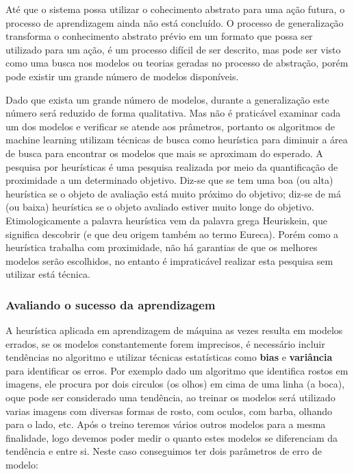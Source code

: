 Até que o sistema possa utilizar o cohecimento abstrato para uma ação futura, o processo de aprendizagem ainda não está concluído.
O processo de generalização transforma o conhecimento abstrato prévio em um formato que possa ser utilizado para um ação, é um 
processo difícil de ser descrito, mas pode ser visto como uma busca nos modelos ou teorias geradas no processo de abstração, porém pode existir
um grande número de modelos disponíveis.

Dado que exista um grande número de modelos, durante a generalização este número será reduzido de forma qualitativa. 
Mas não é praticável examinar cada um dos modelos e verificar se atende aos prâmetros, portanto os algoritmos de machine learning utilizam 
técnicas de busca como heurística para diminuir a área de busca para encontrar os modelos que mais se aproximam do esperado. \cite{heuristica}A pesquisa por heurísticas é uma pesquisa 
realizada por meio da quantificação de proximidade a um determinado objetivo. Diz-se que se tem uma boa (ou alta) heurística se o objeto de avaliação está muito 
próximo do objetivo; diz-se de má (ou baixa) heurística se o objeto avaliado estiver muito longe do objetivo. 
Etimologicamente a palavra heurística vem da palavra grega Heuriskein, que significa descobrir (e que deu origem também ao termo Eureca). 
Porém como a heurística trabalha com proximidade, não há garantias de que os melhores modelos serão escolhidos, 
no entanto é impraticável realizar esta pesquisa sem utilizar está técnica.

\subsubsection{Avaliando o sucesso da aprendizagem}
\label{subsec:avaliando-generalização-dados}

A heurística aplicada em aprendizagem de máquina as vezes resulta em modelos errados, se os modelos constantemente 
forem imprecisos, é necessário incluir tendências no algoritmo e utilizar técnicas estatísticas como \textbf{bias} e \textbf{variância} para identificar os erros.
Por exemplo dado um algoritmo que identifica rostos em imagens, ele procura por dois circulos (os olhos) em cima de uma linha (a boca), oque pode 
ser considerado uma tendência, ao treinar os modelos será utilizado varias imagens com diversas formas de rosto, com oculos, com barba, olhando para o lado, etc.
Após o treino teremos vários outros modelos para a mesma finalidade, logo devemos poder medir o quanto estes modelos 
se diferenciam da tendência e entre si. Neste caso conseguimos ter dois parâmetros de erro de modelo:

